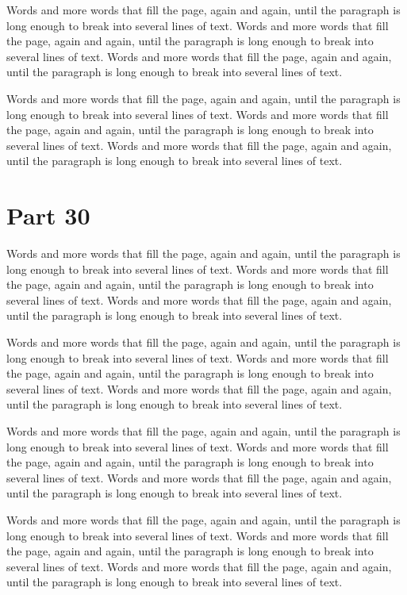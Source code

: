 \documentclass{article}
\begin{document}
Words and more words that fill the page, again and again, until the paragraph is long enough to break into several lines of text. Words and more words that fill the page, again and again, until the paragraph is long enough to break into several lines of text. Words and more words that fill the page, again and again, until the paragraph is long enough to break into several lines of text. 

Words and more words that fill the page, again and again, until the paragraph is long enough to break into several lines of text. Words and more words that fill the page, again and again, until the paragraph is long enough to break into several lines of text. Words and more words that fill the page, again and again, until the paragraph is long enough to break into several lines of text. 

\section{Part 30}
Words and more words that fill the page, again and again, until the paragraph is long enough to break into several lines of text. Words and more words that fill the page, again and again, until the paragraph is long enough to break into several lines of text. Words and more words that fill the page, again and again, until the paragraph is long enough to break into several lines of text. 

Words and more words that fill the page, again and again, until the paragraph is long enough to break into several lines of text. Words and more words that fill the page, again and again, until the paragraph is long enough to break into several lines of text. Words and more words that fill the page, again and again, until the paragraph is long enough to break into several lines of text. 

Words and more words that fill the page, again and again, until the paragraph is long enough to break into several lines of text. Words and more words that fill the page, again and again, until the paragraph is long enough to break into several lines of text. Words and more words that fill the page, again and again, until the paragraph is long enough to break into several lines of text. 

Words and more words that fill the page, again and again, until the paragraph is long enough to break into several lines of text. Words and more words that fill the page, again and again, until the paragraph is long enough to break into several lines of text. Words and more words that fill the page, again and again, until the paragraph is long enough to break into several lines of text. 

\tableofcontents
\end{document}
